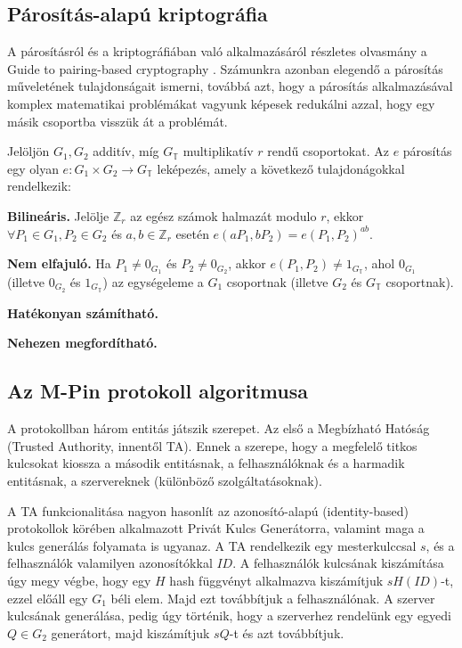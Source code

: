 \subsection{Párosítás-alapú kriptográfia}

A párosításról és a kriptográfiában való alkalmazásáról részletes olvasmány a Guide to pairing-based cryptography \cite{PBCGuide}. Számunkra azonban elegendő a párosítás műveletének tulajdonságait ismerni, továbbá azt, hogy a párosítás alkalmazásával komplex matematikai problémákat vagyunk képesek redukálni azzal, hogy egy másik csoportba visszük át a problémát.

Jelöljön $G_1, G_2$ additív, míg $G_\mathbb{T}$ multiplikatív $r$ rendű csoportokat. Az $e$ párosítás egy olyan $e : G_1 \times G_2 \rightarrow G_\mathbb{T}$ leképezés, amely a következő tulajdonágokkal rendelkezik:
\begin{outdentlist}
    \item[] \textbf{Bilineáris.} Jelölje $\mathbb{Z}_r$ az egész számok halmazát modulo $r$, ekkor $\forall P_1 \in G_1, P_2 \in G_2$ és $a, b \in \mathbb{Z}_r$ esetén $e(aP_1, bP_2) = e(P_1, P_2)^{ab}$.

    \item[] \textbf{Nem elfajuló.} Ha $P_1 \neq 0_{G_1}$ és $P_2 \neq 0_{G_2}$, akkor $e(P_1, P_2) \neq 1_{G_\mathbb{T}}$, ahol $0_{G_1}$ (illetve $0_{G_2}$ és $1_{G_\mathbb{T}}$) az egységeleme a $G_1$ csoportnak (illetve $G_2$ és $G_\mathbb{T}$ csoportnak).

    \item[] \textbf{Hatékonyan számítható.}

    \item[] \textbf{Nehezen megfordítható.}
\end{outdentlist}

\subsection{Az M-Pin protokoll algoritmusa}

A protokollban három entitás játszik szerepet. Az első a Megbízható Hatóság (Trusted Authority, innentől TA). Ennek a szerepe, hogy a megfelelő titkos kulcsokat kiossza a második entitásnak, a felhasználóknak és a harmadik entitásnak, a szervereknek (különböző szolgáltatásoknak). 

A TA funkcionalitása nagyon hasonlít az azonosító-alapú (identity-based) protokollok körében alkalmazott Privát Kulcs Generátorra, valamint maga a kulcs generálás folyamata is ugyanaz. A TA rendelkezik egy mesterkulccsal $s$, és a felhasználók valamilyen azonosítókkal $ID$. A felhasználók kulcsának kiszámítása úgy megy végbe, hogy egy $H$ hash függvényt alkalmazva kiszámítjuk $sH(ID)$-t, ezzel előáll egy $G_1$ béli elem. Majd ezt továbbítjuk a felhasználónak. A szerver kulcsának generálása, pedig úgy történik, hogy a szerverhez rendelünk egy egyedi $Q \in G_2$ generátort, majd kiszámítjuk $sQ$-t és azt továbbítjuk.

